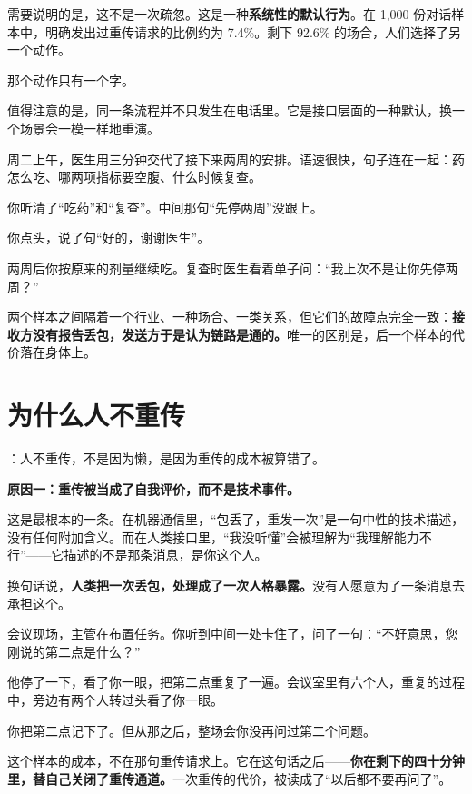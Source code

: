 需要说明的是，这不是一次疏忽。这是一种\textbf{系统性的默认行为}。在 1,000 份对话样本中，明确发出过重传请求的比例约为 7.4\%。剩下 92.6\% 的场合，人们选择了另一个动作。

那个动作只有一个字。

值得注意的是，同一条流程并不只发生在电话里。它是接口层面的一种默认，换一个场景会一模一样地重演。

\par
\begin{mdquote}
周二上午，医生用三分钟交代了接下来两周的安排。语速很快，句子连在一起：药怎么吃、哪两项指标要空腹、什么时候复查。

你听清了“吃药”和“复查”。中间那句“先停两周”没跟上。

你点头，说了句“好的，谢谢医生”。

两周后你按原来的剂量继续吃。复查时医生看着单子问：“我上次不是让你先停两周？”
\end{mdquote}

两个样本之间隔着一个行业、一种场合、一类关系，但它们的故障点完全一致：\textbf{接收方没有报告丢包，发送方于是认为链路是通的。}唯一的区别是，后一个样本的代价落在身体上。

\section{为什么人不重传}

：人不重传，不是因为懒，是因为重传的成本被算错了。

\textbf{原因一：重传被当成了自我评价，而不是技术事件。}

这是最根本的一条。在机器通信里，“包丢了，重发一次”是一句中性的技术描述，没有任何附加含义。而在人类接口里，“我没听懂”会被理解为“我理解能力不行”——它描述的不是那条消息，是你这个人。

换句话说，\textbf{人类把一次丢包，处理成了一次人格暴露。}没有人愿意为了一条消息去承担这个。

\par
\begin{mdquote}
会议现场，主管在布置任务。你听到中间一处卡住了，问了一句：“不好意思，您刚说的第二点是什么？”

他停了一下，看了你一眼，把第二点重复了一遍。会议室里有六个人，重复的过程中，旁边有两个人转过头看了你一眼。

你把第二点记下了。但从那之后，整场会你没再问过第二个问题。
\end{mdquote}

这个样本的成本，不在那句重传请求上。它在这句话之后——\textbf{你在剩下的四十分钟里，替自己关闭了重传通道。}一次重传的代价，被读成了“以后都不要再问了”。

